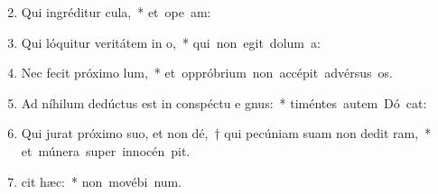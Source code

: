 \begin{flushleft}
\begin{enumerate}[leftmargin=*]
\setcounter{enumi}{1}

\item Qui ingréditur  cula,~* \mbox{et ope am:}
\item Qui lóquitur veritátem in  o,~* \mbox{qui non egit dolum   a:}
\item Nec fecit próximo  lum,~* \mbox{et oppróbrium non accépit advérsus  os.}
\item Ad níhilum dedúctus est in conspéctu e gnus:~* \mbox{timéntes autem Dó cat:}
\item Qui jurat próximo suo, et non dé,~† qui pecúniam suam non dedit  ram,~* \mbox{et múnera super innocén  pit.}
\item {} cit hæc:~* \mbox{non movébi  num.}

\end{enumerate}
\end{flushleft}

